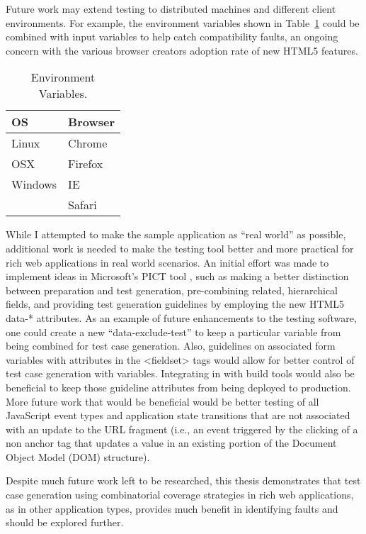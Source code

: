 Future work may extend testing to distributed machines and different client environments.  For example, the environment variables shown in Table~\ref{table:environmentVariables} could be combined with input variables to help catch compatibility faults, an ongoing concern with the various browser creators adoption rate of new HTML5 features.

\begin{table}[h]
	\centering
	\caption{Environment Variables.}
	\begin{tabular}{| l | l |}
		\hline
  OS 			& 	Browser		\\ \hline
  Linux 		& 	Chrome		\\ \hline
  OSX 		& 	Firefox		\\ \hline
  Windows 	&	IE			\\ \hline
			&	Safari		\\
		\hline
	\end{tabular}
\label{table:environmentVariables}
\end{table}

While I attempted to make the sample application as ``real world'' as possible, additional work is needed to make the testing tool better and more practical for rich web applications in real world scenarios.  An initial effort was made to implement ideas in Microsoft's PICT tool \cite{czerwonka2008pairwise}, such as making a better distinction between preparation and test generation, pre-combining related, hierarchical fields, and providing test generation guidelines by employing the new HTML5 data-* attributes.  As an example of future enhancements to the testing software, one could create a new ``data-exclude-test'' to keep a particular variable from being combined for test case generation.  Also, guidelines on associated form variables with attributes in the <fieldset> tags would allow for better control of test case generation with variables.  Integrating in with build tools would also be beneficial to keep those guideline attributes from being deployed to production.  More future work that would be beneficial would be better testing of all JavaScript event types and application state transitions that are not associated with an update to the URL fragment (i.e., an event triggered by the clicking of a non anchor tag that updates a value in an existing portion of the Document Object Model (DOM) structure).

Despite much future work left to be researched, this thesis demonstrates that test case generation using combinatorial coverage strategies in rich web applications, as in other application types, provides much benefit in identifying faults and should be explored further.